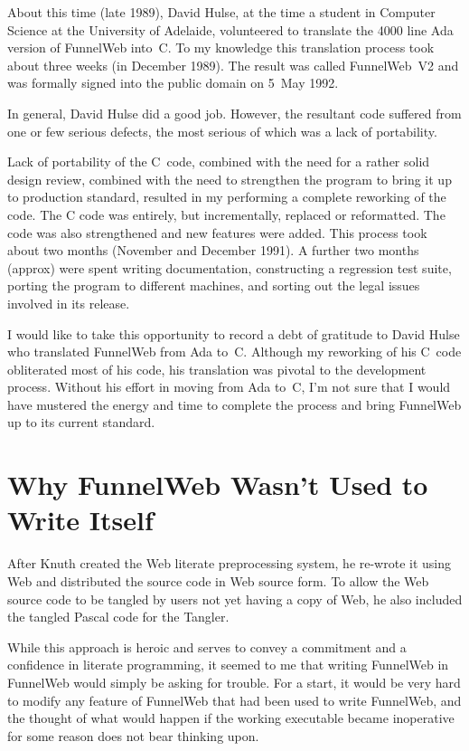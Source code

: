 About this time (late 1989), David Hulse,
at the time a student in
Computer Science at the University of Adelaide,
volunteered to translate the 4000 line Ada version of FunnelWeb into~C.
To my knowledge this translation process took about three weeks
(in December 1989). The result was called FunnelWeb~V2 and was
formally signed into the public domain on 5~May 1992.

In general, David Hulse did a good job. However, the resultant code
suffered from one or few serious defects, the most serious of which was
a lack of portability.

Lack of portability of the C~code, combined with the need for a rather
solid design review, combined with the need to
strengthen the program to bring it up to production standard, resulted
in my performing a complete reworking of the code. The C code was
entirely, but incrementally, replaced or reformatted.
The code was also strengthened and new features were added.
This process took about two months (November and December 1991).
A further two months (approx) were spent writing documentation, constructing
a regression test suite, porting the program to different machines,
and sorting out the legal issues involved in its release.

I would like to take this opportunity to record a debt of gratitude to
David Hulse who translated FunnelWeb from Ada to~C. Although my
reworking of his C~code obliterated most of his code,
his translation was pivotal to the development process.
Without his effort in moving from Ada to~C, I'm not sure that I
would have mustered the energy and time to complete the process and
bring FunnelWeb up to its current standard.

\section{Why FunnelWeb Wasn't Used to Write Itself}

After Knuth created the Web literate preprocessing system, he
re-wrote it using Web and distributed the source code in Web source form.
To allow the Web source code to be tangled by users not yet having a
copy of Web, he also included the tangled Pascal code for the Tangler.

While this approach is heroic and serves to convey a commitment and
a confidence in literate programming, it seemed to me that writing FunnelWeb
in FunnelWeb would simply be asking for trouble.
For a start, it would be
very hard to modify any feature of FunnelWeb that had been used to write
FunnelWeb, and the thought of what would happen if the working executable
became inoperative for some reason does not bear thinking upon.

